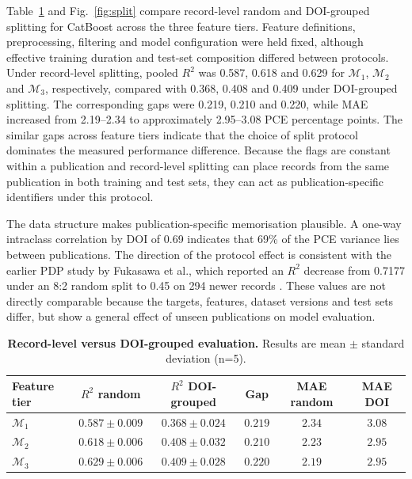 \documentclass[3p]{elsarticle}
\begin{document}
Table~\ref{tab:split} and Fig.~\ref{fig:split} compare record-level random and DOI-grouped splitting for CatBoost across the three feature tiers. Feature definitions, preprocessing, filtering and model configuration were held fixed, although effective training duration and test-set composition differed between protocols. Under record-level splitting, pooled $R^2$ was 0.587, 0.618 and 0.629 for $\mathcal{M}_1$, $\mathcal{M}_2$ and $\mathcal{M}_3$, respectively, compared with 0.368, 0.408 and 0.409 under DOI-grouped splitting. The corresponding gaps were 0.219, 0.210 and 0.220, while MAE increased from 2.19--2.34 to approximately 2.95--3.08 PCE percentage points. The similar gaps across feature tiers indicate that the choice of split protocol dominates the measured performance difference. Because the flags are constant within a publication and record-level splitting can place records from the same publication in both training and test sets, they can act as publication-specific identifiers under this protocol.

The data structure makes publication-specific memorisation plausible. A one-way intraclass correlation by DOI of 0.69 indicates that 69\% of the PCE variance lies between publications. The direction of the protocol effect is consistent with the earlier PDP study by Fukasawa et al., which reported an $R^2$ decrease from 0.7177 under an 8:2 random split to 0.45 on 294 newer records \cite{fukasawa2024effectiveness}. These values are not directly comparable because the targets, features, dataset versions and test sets differ, but show a general effect of unseen publications on model evaluation.

\begin{table}[htbp]
    \centering\small
    \caption{\textbf{Record-level versus DOI-grouped evaluation.} Results are mean $\pm$ standard deviation (n=5).}
    \label{tab:split}
    \begin{tabular}{lccccc}
        \toprule
        Feature tier & $R^2$ random & $R^2$ DOI-grouped & Gap & MAE random & MAE DOI \\
        \midrule
        $\mathcal{M}_1$ & $0.587 \pm 0.009$ & $0.368 \pm 0.024$ & $0.219$ & $2.34$ & $3.08$ \\
        $\mathcal{M}_2$ & $0.618 \pm 0.006$ & $0.408 \pm 0.032$ & $0.210$ & $2.23$ & $2.95$ \\
        $\mathcal{M}_3$ & $0.629 \pm 0.006$ & $0.409 \pm 0.028$ & $0.220$ & $2.19$ & $2.95$ \\
        \bottomrule
    \end{tabular}
\end{table}
\end{document}
